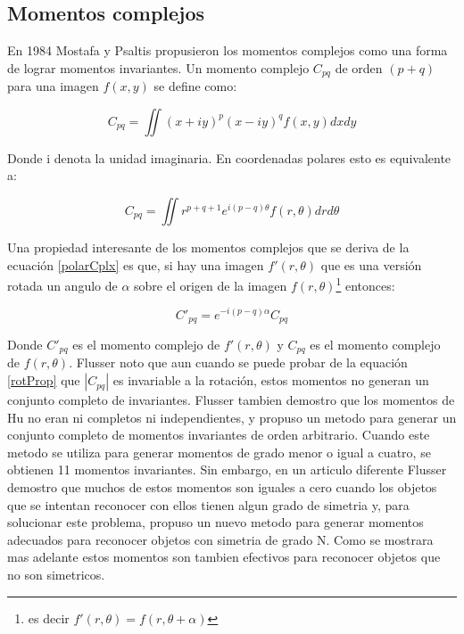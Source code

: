 \documentclass[a4paper, 11pt, oneside]{report}
\begin{document}
\subsection{Momentos complejos}

En 1984 Mostafa y Psaltis \cite{mostaf84} propusieron los momentos complejos como una forma de lograr momentos invariantes. Un momento complejo $C_{pq}$ de orden $(p+q)$ para una imagen $f(x,y)$ se define como:

	\[ C_{pq} = \iint{ (x+iy)^p (x-iy)^q f(x,y) dx dy } \]
	
Donde i denota la unidad imaginaria. En coordenadas polares esto es equivalente a:

	\begin{equation}\label{polarCplx}
		C_{pq} = \iint{ r^{p+q+1}e^{i(p-q)\theta}f(r,\theta) dr d\theta }
	\end{equation}

Una propiedad interesante de los momentos complejos que se deriva de la ecuación \eqref{polarCplx} es que, si hay una imagen $f'(r,\theta)$ que es una versión rotada un angulo de $\alpha$ sobre el origen de la imagen $f(r,\theta)$\footnote{es decir $f'(r,\theta) = f(r,\theta+\alpha)$} entonces:

\begin{equation}\label{rotProp}
	C'_{pq} = e^{-i(p-q)\alpha}C_{pq}
\end{equation}

Donde $C'_{pq}$ es el momento complejo de $f'(r,\theta)$ y $C_{pq}$ es el momento complejo de $f(r,\theta)$. Flusser noto \cite{flusser99} que aun cuando se puede probar de la equación \eqref{rotProp} que $|C_{pq}|$ es invariable a la rotación, estos momentos no generan un conjunto completo de invariantes. Flusser tambien demostro que los momentos de Hu no eran ni completos ni independientes, y propuso un metodo para generar un conjunto completo de momentos invariantes de orden arbitrario. Cuando este metodo se utiliza para generar momentos de grado menor o igual a cuatro, se obtienen 11 momentos invariantes.\newline
Sin embargo, en un articulo diferente\cite{flusser06} Flusser demostro que muchos de estos momentos son iguales a cero cuando los objetos que se intentan reconocer con ellos tienen algun grado de simetria y, para solucionar este problema, propuso un nuevo metodo para generar momentos adecuados para reconocer objetos con simetria de grado N. Como se mostrara mas adelante estos momentos son tambien efectivos para reconocer objetos que no son simetricos.
\end{document}
